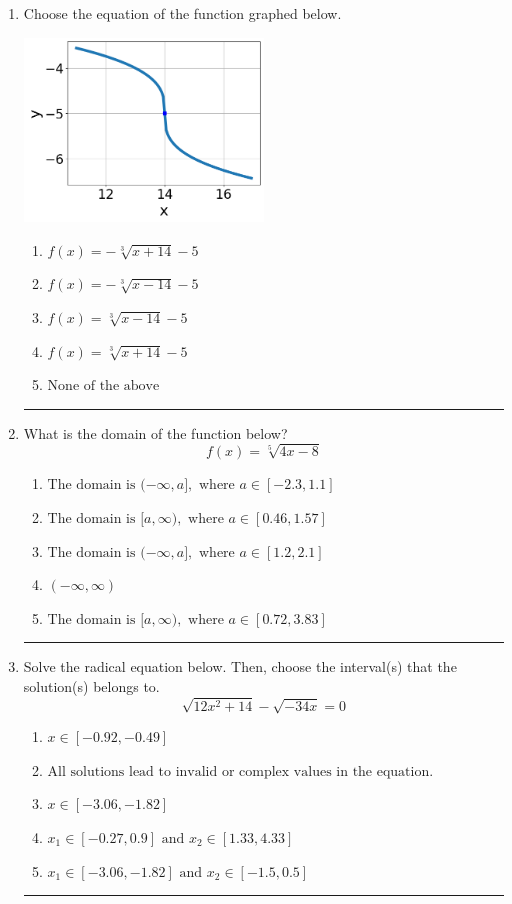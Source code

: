 \documentclass[14pt]{extbook}
\newcommand{\litem}[1]{\item#1\hspace*{-1cm}\rule{\textwidth}{0.4pt}}
\begin{document}
\begin{enumerate}
{\begin{enumerate}[label=\Alph*.]
\end{enumerate} }
\litem{
Choose the equation of the function graphed below.
\begin{center}
    \includegraphics[width=0.5\textwidth]{../Figures/radicalGraphToEquationCopyB.png}
\end{center}
\begin{enumerate}[label=\Alph*.]
\item \( f(x) = - \sqrt[3]{x + 14} - 5 \)
\item \( f(x) = - \sqrt[3]{x - 14} - 5 \)
\item \( f(x) = \sqrt[3]{x - 14} - 5 \)
\item \( f(x) = \sqrt[3]{x + 14} - 5 \)
\item \( \text{None of the above} \)

\end{enumerate} }
\litem{
What is the domain of the function below?\[ f(x) = \sqrt[5]{4 x - 8} \]\begin{enumerate}[label=\Alph*.]
\item \( \text{The domain is } (-\infty, a], \text{   where } a \in [-2.3, 1.1] \)
\item \( \text{The domain is } [a, \infty), \text{   where } a \in [0.46, 1.57] \)
\item \( \text{The domain is } (-\infty, a], \text{   where } a \in [1.2, 2.1] \)
\item \( (-\infty, \infty) \)
\item \( \text{The domain is } [a, \infty), \text{   where } a \in [0.72, 3.83] \)

\end{enumerate} }
\litem{
Solve the radical equation below. Then, choose the interval(s) that the solution(s) belongs to.\[ \sqrt{12 x^2 + 14} - \sqrt{-34 x} = 0 \]\begin{enumerate}[label=\Alph*.]
\item \( x \in [-0.92,-0.49] \)
\item \( \text{All solutions lead to invalid or complex values in the equation.} \)
\item \( x \in [-3.06,-1.82] \)
\item \( x_1 \in [-0.27, 0.9] \text{ and } x_2 \in [1.33,4.33] \)
\item \( x_1 \in [-3.06, -1.82] \text{ and } x_2 \in [-1.5,0.5] \)


\end{enumerate}}
\end{enumerate}
\end{document}
